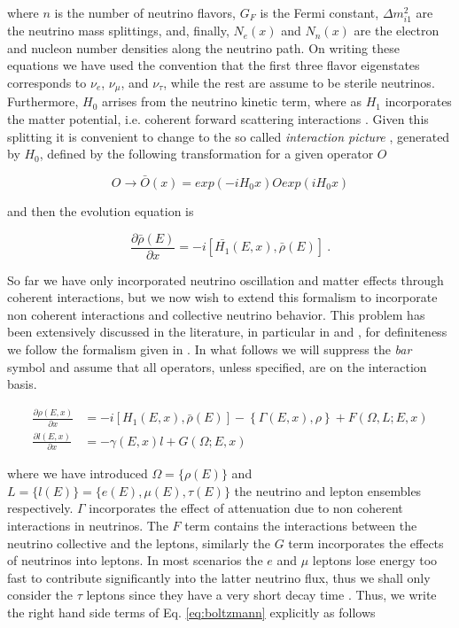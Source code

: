 \documentclass[3p,12pt,authoryear]{elsarticle}
\newcommand{\pa}[2]{\frac{\partial #1}{\partial #2}}
\begin{document}
where $n$ is the number of neutrino flavors, $G_F$ is the Fermi constant, $\Delta m^2_{i1}$ are the neutrino mass splittings, and, finally, $N_e(x)$ and $N_n(x)$ are the electron and nucleon number densities along the neutrino path. On writing these equations we have used the convention that the first three flavor eigenstates corresponds to $\nu_e$, $\nu_\mu$, and $\nu_\tau$, while the rest are assume to be sterile neutrinos. Furthermore, $H_0$ arrises from the neutrino kinetic term, where as $H_1$ incorporates the matter potential, i.e. coherent forward scattering interactions \citep{Mikheev:1986gs,Mikheev:1986wj,Wolfenstein:1977ue}. Given this splitting it is convenient to change to the so called {\it interaction picture} , generated by $H_0$, defined by the following transformation for a given operator $O$

\begin{equation}
O \to \bar{O}(x)=exp(-iH_0x)Oexp(iH_0x)
\end{equation}

and then the evolution equation is

\begin{equation}
\pa{\bar{\rho}(E)}{x} = -i [ \bar{H_1} (E,x), \bar{\rho}(E) ]~.
\label{eq:schrodinger}
\end{equation}

So far we have only incorporated neutrino oscillation and matter effects through coherent interactions, but we now wish to extend this formalism to incorporate non coherent interactions and collective neutrino behavior. This problem has been extensively discussed in the literature, in particular in \citep{Duan:2010tk,Strack:qd,Zhang:2013ay} and \citep{Cirelli:mw,Blennow:2007tw,Arguelles:2012cf}, for definiteness we follow the formalism given in \citep{Gonzalez-Garcia:2005xw}. In what follows we will suppress the {\it bar} symbol and assume that all operators, unless specified, are on the interaction basis. 

\begin{subequations}
\label{eq:boltzmann}
\begin{align}
\pa{\rho(E,x)}{x} &= -i [ H_1 (E,x), \bar{\rho}(E) ] - \left\{ \Gamma(E,x), \rho \right\} + F(\Omega,L;E,x) \\
\pa{l(E,x)}{x} &= - \gamma(E,x)l + G(\Omega;E,x)
\end{align}
\end{subequations}

where we have introduced $\Omega = \{\rho(E)\} $ and $ L = \{ l(E) \} = \{ e(E), \mu(E), \tau(E) \}$ the neutrino and lepton ensembles respectively. $\Gamma$ incorporates the effect of attenuation due to non coherent interactions in neutrinos. The $F$ term contains the interactions between the neutrino collective and the leptons, similarly the $G$ term incorporates the effects of neutrinos into leptons. In most scenarios the $e$ and $\mu$ leptons lose energy too fast to contribute significantly into the latter neutrino flux, thus we shall only consider the $\tau$ leptons since they have a very short decay time \citep{Halzen:kq}. Thus, we write the right hand side terms of Eq. \eqref{eq:boltzmann}  explicitly as follows
\end{document}

